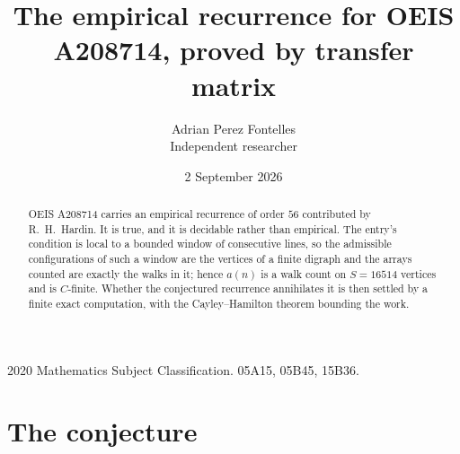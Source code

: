 \documentclass[11pt,a4paper]{article}
\title{The empirical recurrence for OEIS A208714, proved by transfer matrix}
\author{Adrian Perez Fontelles\\ \small Independent researcher}
\date{2 September 2026}
\theoremstyle{plain}
\theoremstyle{definition}
\begin{document}
\maketitle

\begin{abstract}
OEIS A208714 carries an empirical recurrence of order $56$ contributed by R.~H.~Hardin. It is
true, and it is decidable rather than empirical. The entry's condition is local to a bounded window of consecutive lines, so
the admissible configurations of such a window are the vertices of a finite digraph and the
arrays counted are exactly the walks in it; hence $a(n)$ is a walk count on $S=16514$ vertices
and is $C$-finite. Whether the conjectured recurrence annihilates it is then settled by a
finite exact computation, with the Cayley--Hamilton theorem bounding the work.
\end{abstract}

\noindent\small 2020 Mathematics Subject Classification. 05A15, 05B45, 15B36.\normalsize

\section{The conjecture}
\end{document}
